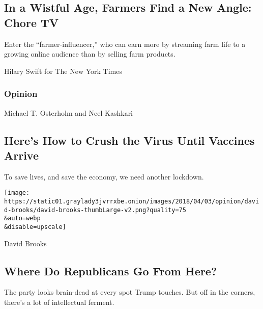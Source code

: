 \hypertarget{in-a-wistful-age-farmers-find-a-new-angle-chore-tv}{%
\subsection{In a Wistful Age, Farmers Find a New Angle: Chore
TV}\label{in-a-wistful-age-farmers-find-a-new-angle-chore-tv}}

Enter the ``farmer-influencer,'' who can earn more by streaming farm
life to a growing online audience than by selling farm products.

\href{/2020/08/07/us/farmer-influencer-youtube.html}{}

Hilary Swift for The New York Times

\href{https://www.nytimes3xbfgragh.onion/section/opinion?pagetype=Homepage\&action=click\&module=Opinion}{}

\hypertarget{opinion}{%
\subsubsection{Opinion}\label{opinion}}

\href{/2020/08/07/opinion/coronavirus-lockdown-unemployment-death.html}{}

Michael T. Osterholm and Neel Kashkari

\hypertarget{heres-how-to-crush-the-virus-until-vaccines-arrive}{%
\subsection{Here's How to Crush the Virus Until Vaccines
Arrive}\label{heres-how-to-crush-the-virus-until-vaccines-arrive}}

To save lives, and save the economy, we need another lockdown.

\href{/2020/08/07/opinion/sunday/republican-party-trump-2020.html}{}

\texttt{[image: https://static01.graylady3jvrrxbe.onion/images/2018/04/03/opinion/david-brooks/david-brooks-thumbLarge-v2.png?quality=75\\\&auto=webp\\\&disable=upscale]}

David Brooks

\hypertarget{where-do-republicans-go-from-here}{%
\subsection{Where Do Republicans Go From
Here?}\label{where-do-republicans-go-from-here}}

The party looks brain-dead at every spot Trump touches. But off in the
corners, there's a lot of intellectual ferment.

